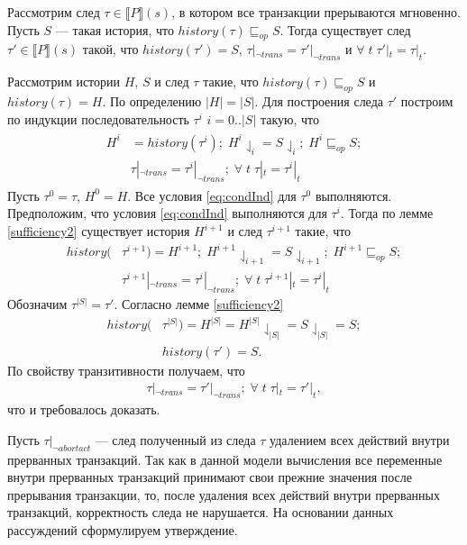 \begin{lemma}\label{sufficiency3}
Рассмотрим след $\tau \in \llbracket P \rrbracket (s)$, в котором все транзакции прерываются мгновенно. Пусть $S$ --- такая история, что $history(\tau) \sqsubseteq_{op} S$. Тогда существует след $\tau' \in \llbracket P \rrbracket (s)$ такой, что $history(\tau') = S$, $\tau|_{\neg trans} = \tau'|_{\neg trans}$ и $\forall \; t \; \tau'|_t = \tau|_t$. \end{lemma}
\begin{myproof}
Рассмотрим истории $H$, $S$ и след $\tau$ такие, что $history(\tau) \sqsubseteq_{op} S$ и $history(\tau) = H$. По определению $|H| = |S|$. Для построения следа $\tau'$ построим по индукции последовательность $\tau^i$ $i = 0..|S|$ такую, что
\begin{align}\label{eq:condInd}
\begin{split}
H^i &= history(\tau^i); \; H^i \downharpoonleft_{i} = S \downharpoonleft_{i}; \; H^i \sqsubseteq_{op} S; \\
&\tau|_{\neg trans} = \tau^i|_{\neg trans}; \; \forall \; t \; \tau|_{t} = \tau^i|_{t}
\end{split} 
\end{align}
Пусть $\tau^0 = \tau$, $H^0 = H$. Все условия \eqref{eq:condInd} для $\tau^0$ выполняются. Предположим, что условия \eqref{eq:condInd} выполняются для $\tau^i$. Тогда по лемме \ref{sufficiency2} существует история $H^{i+1}$ и след $\tau^{i+1}$ такие, что
\begin{align*}
history(&\tau^{i+1}) = H^{i+1}; \; H^{i+1}\downharpoonleft_{i+1} = S\downharpoonleft_{i+1}; \; H^{i+1} \sqsubseteq_{op} S; \\ 
&\tau^{i+1}|_{\neg trans} = \tau^i|_{\neg trans}; \; \forall \; t \; \tau^{i+1}|_{t} = \tau^i|_{t}
\end{align*}
Обозначим $\tau^{|S|} = \tau'$. Согласно лемме \ref{sufficiency2}
\begin{align*}
history(&\tau^{|S|}) = H^{|S|} = H^{|S|}\downharpoonleft_{|S|} = S\downharpoonleft_{|S|} = S;\\ 
&history(\tau') = S.
\end{align*}
По свойству транзитивности получаем, что 
\begin{align*}
\tau|_{\neg trans} = \tau'|_{\neg trans}; \; \forall \; t \; \tau|_{t} = \tau'|_{t},
\end{align*}
что и требовалось доказать.
\end{myproof}
Пусть $\tau|_{\neg abortact}$ --- след полученный из следа $\tau$ удалением всех действий внутри прерванных транзакций. Так как в данной модели вычисления все переменные внутри прерванных транзакций принимают свои прежние значения после прерывания транзакции, то, после удаления всех действий внутри прерванных транзакций, корректность следа не нарушается. На основании данных рассуждений сформулируем утверждение.

